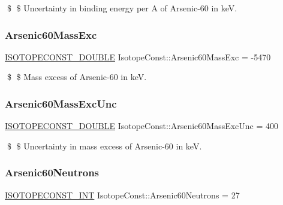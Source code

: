 \$ \$ Uncertainty in binding energy per A of Arsenic-\/60 in keV. \mbox{\label{group___isotope_const-_arsenic-_as60_ga85382c59f42ae5726823870f111c7414}} 
\subsubsection{\texorpdfstring{Arsenic60\+Mass\+Exc}{Arsenic60MassExc}}
{\footnotesize\ttfamily \mbox{\hyperlink{group___isotope_const-_macros_ga8f45a7272ce02c0b4c65c44636ed719a}{I\+S\+O\+T\+O\+P\+E\+C\+O\+N\+S\+T\+\_\+\+D\+O\+U\+B\+LE}} Isotope\+Const\+::\+Arsenic60\+Mass\+Exc = -\/5470}

\$ \$ Mass excess of Arsenic-\/60 in keV. \mbox{\label{group___isotope_const-_arsenic-_as60_gadd5e9fce4a1bccad39c5385c294d51a0}} 
\subsubsection{\texorpdfstring{Arsenic60\+Mass\+Exc\+Unc}{Arsenic60MassExcUnc}}
{\footnotesize\ttfamily \mbox{\hyperlink{group___isotope_const-_macros_ga8f45a7272ce02c0b4c65c44636ed719a}{I\+S\+O\+T\+O\+P\+E\+C\+O\+N\+S\+T\+\_\+\+D\+O\+U\+B\+LE}} Isotope\+Const\+::\+Arsenic60\+Mass\+Exc\+Unc = 400}

\$ \$ Uncertainty in mass excess of Arsenic-\/60 in keV. \mbox{\label{group___isotope_const-_arsenic-_as60_ga955dc98d6e2c5550a541ae96854e94cd}} 
\subsubsection{\texorpdfstring{Arsenic60\+Neutrons}{Arsenic60Neutrons}}
{\footnotesize\ttfamily \mbox{\hyperlink{group___isotope_const-_macros_ga5f18360b3e99483a35c32d789e62621c}{I\+S\+O\+T\+O\+P\+E\+C\+O\+N\+S\+T\+\_\+\+I\+NT}} Isotope\+Const\+::\+Arsenic60\+Neutrons = 27}

